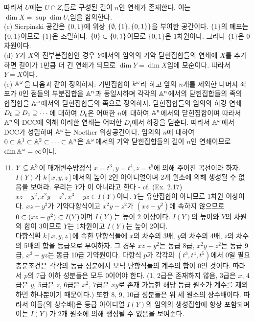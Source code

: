 \begin{enumerate}[label=\tb{1.\arabic*.},itemindent=0mm,itemsep=4mm]
		따라서 $U$에는 $U\cap Z_i$들로 구성된 길이 $n$인 연쇄가 존재한다. 이는 $\dim X=\sup\dim U_i$임을 함의한다.\\
		(c) Sierpinski 공간은 $\{0,1\}$에 위상 $\{\emptyset,\{1\},\{0,1\}\}$을 부여한 공간이다.
		$\{1\}$의 폐포는 $\{0,1\}$이므로 $\{1\}$은 조밀하다.
		$\{0\}\subset\{0,1\}$이므로 $\{0,1\}$은 1차원이다. 그러나 $\{1\}$은 0차원이다.\\
		(d) $Y$가 $X$의 진부분집합인 경우 $Y$에서의 임의의 기약 닫힌집합들의 연쇄에 $X$를 추가하면 길이가 1만큼 더 긴 연쇄가 되므로
		$\dim Y=\dim X$임에 모순이다. 따라서 $Y=X$이다.\\
		(e) $\mathbb{A}^\omega$을 다음과 같이 정의하자: 기반집합이 $k^\omega$라 하고
		앞의 $n$개를 제외한 나머지 좌표가 0인 점들의 부분집합을 $\mathbb{A}^n$과 동일시하며
		각각의 $\mathbb{A}^n$에서의 닫힌집합들의 족의 합집합을 $\mathbb{A}^\omega$에서의 닫힌집합들의 족으로 정의하자.
		닫힌집합들의 임의의 하강 연쇄 $D_0\supseteq D_1\supseteq\cdots$에 대하여 $D_0$은 어떠한 $n$에 대하여 $\mathbb{A}^n$에서의 닫힌집합이며
		따라서 $\mathbb{A}^n$의 DCC에 의해 이러한 연쇄는 어떠한 $D_i$에서 하강을 멈춘다.
		따라서 $\mathbb{A}^\omega$에서 DCC가 성립하며 $\mathbb{A}^\omega$는 Noether 위상공간이다.
		임의의 $n$에 대하여 $0\subset\mathbb{A}^1\subset\mathbb{A}^2\subset\cdots\subset\mathbb{A}^n$은 $\mathbb{A}^\omega$에서의
		기약 닫힌집합들의 길이 $n$인 연쇄이므로 $\dim\mathbb{A}^\omega=\infty$이다.
	\end{enumerate}
	\begin{enumerate}[label=\tb{*1.\arabic*.},itemindent=0mm,topsep=4mm]
		\setcounter{enumi}{10}
		\item $Y\subseteq\mathbb{A}^3$이 매개변수방정식 $x=t^3,y=t^4,z=t^5$에 의해 주어진 곡선이라 하자.
		$I(Y)$가 $k[x,y,z]$에서의 높이 2인 아이디얼이며 2개 원소에 의해 생성될 수 없음을 보여라.
		우리는 $Y$가 이 아니라고 한다 - cf. (Ex. 2.17)\\
		\sol $xz-y^2,x^2y-z^2,x^3-yz\in I(Y)$이다. $Y$는 유한집합이 아니므로 1차원 이상이다.
		$xz-y^2$가 기약다항식이고 $x^2y-z^2$가 $(xz-y^2)$에 속하지 않으므로 $0\subset(xz-y^2)\subset I(Y)$이며 $I(Y)$는 높이 2 이상이다.
		$I(Y)$의 높이와 $Y$의 차원의 합이 3이므로 $Y$는 1차원이고 $I(Y)$는 높이 2이다.\\
		다항식환 $k[x,y,z]$에 속한 단항식들에 $x$의 차수의 3배, $y$의 차수의 4배, $z$의 차수의 5배의 합을 등급으로 부여하자.
		그 경우 $xz-y^2$는 동급 8급, $x^2y-z^2$는 동급 9급, $x^3-yz$는 동급 10급 기약원이다.
		다항식 $p$가 각각의 $(t^3,t^4,t^5)$에서 0일 필요충분조건은 각각의 동급 성분에서 모닉 단항식들의 계수의 합이 0인 것이다.
		따라서 $p$의 7급 이하 성분들은 모두 0이어야 한다.
		(1, 2급은 존재하지 않음, 3급은 $x$, 4급은 $y$, 5급은 $z$, 6급은 $x^2$, 7급은 $xy$로
		존재 가능한 해당 등급 원소가 계수를 제외하면 하나뿐이기 때문이다.)
		또한 8, 9, 10급 성분들은 위 세 원소의 상수배이다.
		따라서 이들(의 상수배)은 등급 아이디얼 $I(Y)$의 임의의 생성집합에 항상 포함되며
		이는 $I(Y)$가 2개 원소에 의해 생성될 수 없음을 보여준다.
	\end{enumerate}
